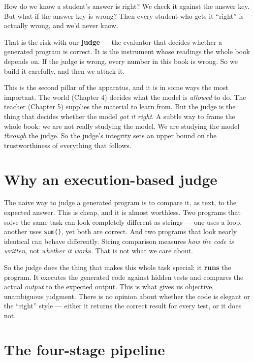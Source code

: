 How do we know a student's answer is right? We check it against the
answer key. But what if the answer key is wrong? Then every student who
gets it ``right'' is actually wrong, and we'd never know.

That is the risk with our \textbf{judge} --- the evaluator that decides
whether a generated program is correct. It is the instrument whose
readings the whole book depends on. If the judge is wrong, every number
in this book is wrong. So we build it carefully, and then we attack it.

This is the second pillar of the apparatus, and it is in some ways the
most important. The world (Chapter 4) decides what the model is
\emph{allowed} to do. The teacher (Chapter 5) supplies the material to
learn from. But the judge is the thing that decides whether the model
\emph{got it right}. A subtle way to frame the whole book: we are not
really studying the model. We are studying the model \emph{through} the
judge. So the judge's integrity sets an upper bound on the
trustworthiness of everything that follows.

\section{Why an execution-based
judge}\label{why-an-execution-based-judge}

The naive way to judge a generated program is to compare it, as text, to
the expected answer. This is cheap, and it is almost worthless. Two
programs that solve the same task can look completely different as
strings --- one uses a loop, another uses \texttt{sum()}, yet both are
correct. And two programs that look nearly identical can behave
differently. String comparison measures \emph{how the code is written},
not \emph{whether it works}. That is not what we care about.

So the judge does the thing that makes this whole task special: it
\textbf{runs} the program. It executes the generated code against hidden
tests and compares the actual \emph{output} to the expected output. This
is what gives us objective, unambiguous judgment. There is no opinion
about whether the code is elegant or the ``right'' style --- either it
returns the correct result for every test, or it does not.

\section{The four-stage pipeline}\label{the-four-stage-pipeline}

